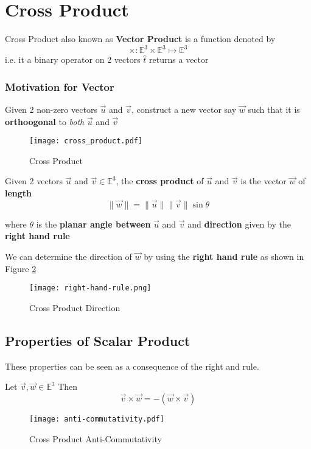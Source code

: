 \section{Cross Product}

Cross Product also known as {\bf Vector Product} is a function denoted by
$$\times : \mathbb{E}^3 \times \mathbb{E}^3 \mapsto \mathbb{E}^3$$
i.e. it a binary operator on 2 vectors $\hat{t}$ returns a vector

\subsubsection{Motivation for Vector}
\vspace{-5px}
Given 2 non-zero vectors $\vec{u}$ and $\vec{v}$, construct a new vector say $\vec{w}$ such that it is {\bf orthoogonal} to {\em both} $\vec{u}$ and $\vec{v}$
\begin{figure}[ht]
	\centering
	\texttt{[image: cross\_product.pdf]}
	\caption{Cross Product}
	\label{fig:figure-9-cross-product}
\end{figure}

\begin{definition}
	Given 2 vectors $\vec{u}$ and $\vec{v} \in \mathbb{E}^3$, the {\bf cross product} of $\vec{u}$ and $\vec{v}$ is the vector $\vec{w}$ of {\bf length}
	\begin{equation}
		\label{eq:cross-product-length}
		\|\vec{w}\| = \|\vec{u}\|\|\vec{v}\|\sin\theta
	\end{equation}

	where $\theta$ is the {\bf planar angle between} $\vec{u}$ and $\vec{v}$ and {\bf direction} given by the {\bf right hand rule}
\end{definition}

We can determine the direction of $\vec{w}$ by using the {\bf right hand rule} as shown in Figure \ref{fig:figure-9-cross-product-direction}

\begin{figure}[ht]
	\centering
	\texttt{[image: right-hand-rule.png]}
	\caption{Cross Product Direction}
	\label{fig:figure-9-cross-product-direction}
\end{figure}

\subsection{Properties of Scalar Product}
These properties can be seen as a consequence of the right and rule.
\begin{theorem}
	Let $\vec{v}, \vec{w} \in \mathbb{E}^3$ Then
	\begin{equation}
		\label{eq:cross-product-anti-commutativity}
		\vec{v} \times \vec{w} = -(\vec{w} \times \vec{v})
	\end{equation}
\end{theorem}
\begin{figure}[ht]
	\centering
	\texttt{[image: anti-commutativity.pdf]}
	\caption{Cross Product Anti-Commutativity}
	\label{fig:figure-9-cross-product-anti-commutativity}
\end{figure}

